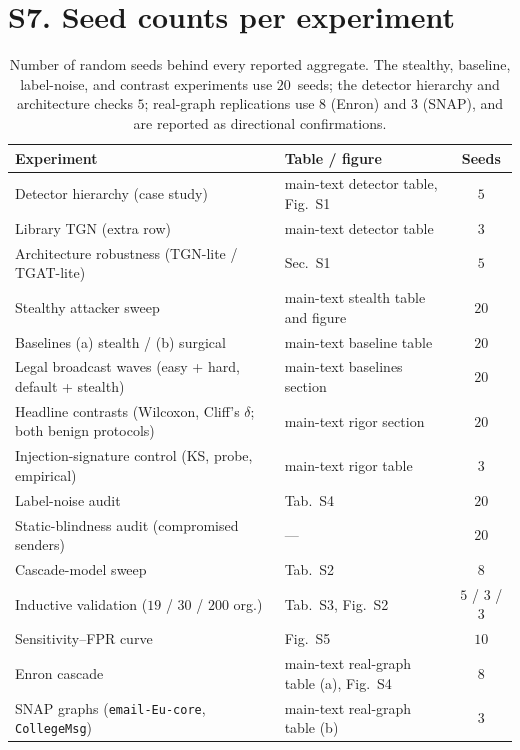 \documentclass[a4paper,11pt]{article}
\begin{document}
\clearpage
\section*{S7. Seed counts per experiment}

\begin{table}[h]\centering\small
\begin{tabular}{llc}
\toprule
Experiment & Table / figure & Seeds \\
\midrule
Detector hierarchy (case study) & main-text detector table, Fig.~S1 & $5$ \\
Library TGN (extra row) & main-text detector table & $3$ \\
Architecture robustness (TGN-lite / TGAT-lite) & Sec.~S1 & $5$ \\
Stealthy attacker sweep & main-text stealth table and figure & $20$ \\
Baselines (a) stealth / (b) surgical & main-text baseline table & $20$ \\
Legal broadcast waves (easy + hard, default + stealth) & main-text baselines section & $20$ \\
Headline contrasts (Wilcoxon, Cliff's $\delta$; both benign protocols) & main-text rigor section & $20$ \\
Injection-signature control (KS, probe, empirical) & main-text rigor table & $3$ \\
Label-noise audit & Tab.~S4 & $20$ \\
Static-blindness audit (compromised senders) & --- & $20$ \\
Cascade-model sweep & Tab.~S2 & $8$ \\
Inductive validation ($19$ / $30$ / $200$ org.) & Tab.~S3, Fig.~S2 & $5$ / $3$ / $3$ \\
Sensitivity--FPR curve & Fig.~S5 & $10$ \\
Enron cascade & main-text real-graph table (a), Fig.~S4 & $8$ \\
SNAP graphs (\texttt{email-Eu-core}, \texttt{CollegeMsg}) & main-text real-graph table (b) & $3$ \\
\bottomrule
\end{tabular}
\caption{Number of random seeds behind every reported aggregate. The stealthy, baseline,
label-noise, and contrast experiments use $20$~seeds; the detector hierarchy and architecture checks
$5$; real-graph replications use $8$ (Enron) and $3$ (SNAP), and are reported as directional
confirmations.}
\label{stab:seeds}
\end{table}
\end{document}

